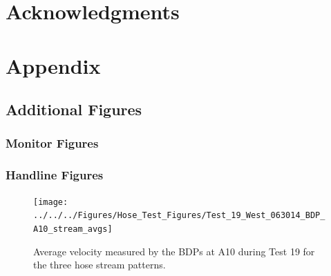 \documentclass[12pt,oneside]{book}
\begin{document}
\chapter{Acknowledgments}
\label{chap:acknowledgments}



\appendix
\chapter{Appendix}
\label{chap:appendix}

\section{Additional Figures}
\label{sec:additional_figs}

\subsection{Monitor Figures}
\label{subsec:monitor_figs}

\subsection{Handline Figures}
\label{subsec:handline_figs}

\begin{figure}[!ht]
\texttt{[image: ../../../Figures/Hose\_Test\_Figures/Test\_19\_West\_063014\_BDP\_A10\_stream\_avgs]}
\caption{Average velocity measured by the BDPs at A10 during Test 19 for the three hose stream patterns.}
\label{fig:Test_19_BDP_A10_Avg_All}
\end{figure}

\clearpage
\end{document}
